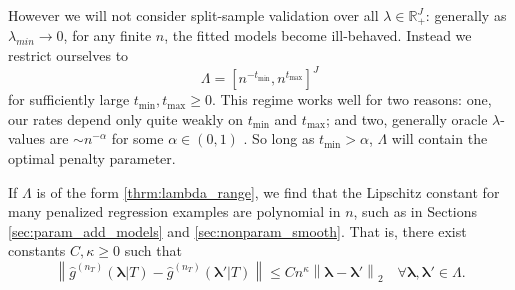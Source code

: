 \documentclass[12pt]{article} %
\theoremstyle{definition}
\begin{document}
However we will not consider split-sample validation over all $\lambda\in\mathbb{R}^J_+$: generally as $\lambda_{min} \rightarrow 0$, for any finite $n$, the fitted models become ill-behaved. Instead we restrict ourselves to 
\begin{equation}
\label{thrm:lambda_range}
\Lambda = [ n^{-t_{\min}}, n^{t_{\max}}]^J
\end{equation}
for sufficiently large $t_{\min}, t_{\max} \ge 0$. This regime works well for two reasons: one, our rates depend only quite weakly on $t_{\min}$ and $t_{\max}$; and two, generally oracle $\lambda$-values are $\sim n^{-\alpha}$ for some $\alpha \in (0,1)$ \citep{van2000empirical, van2014additive, buhlmann2011statistics}. So long as $t_{\min} > \alpha$, $\Lambda$ will contain the optimal penalty parameter.

If $\Lambda$ is of the form \eqref{thrm:lambda_range}, we find that the Lipschitz constant for many penalized regression examples are polynomial in $n$, such as in Sections \ref{sec:param_add_models} and \ref{sec:nonparam_smooth}. That is, there exist constants $C, \kappa \ge 0$ such that
\begin{equation}
\label{thrm:lipschitz_pen_reg}
\left \| \hat{g}^{(n_T)}(\boldsymbol{\lambda}|T) - \hat{g}^{(n_T)}(\boldsymbol{\lambda}'|T) \right \| \le C n^\kappa \left \| \boldsymbol{\lambda} - \boldsymbol{\lambda}' \right \|_2 \quad \forall \boldsymbol{\lambda}, \boldsymbol{\lambda}' \in \Lambda.
\end{equation}
\end{document}
